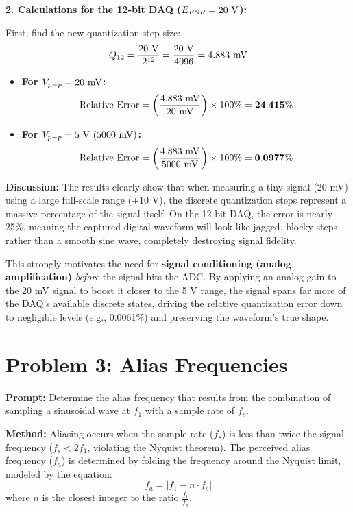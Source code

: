 \documentclass[11pt]{article}
\begin{document}
\textbf{2. Calculations for the 12-bit DAQ ($E_{FSR} = 20 \text{ \si{\volt}}$):}

First, find the new quantization step size:
\[ Q_{12} = \frac{20 \text{ \si{\volt}}}{2^{12}} = \frac{20 \text{ \si{\volt}}}{4096} = 4.883 \text{ \si{\milli\volt}} \]
\begin{itemize}
  \item \textbf{For $V_{p-p} = 20 \text{ \si{\milli\volt}}$:} \\
    \[ \text{Relative Error} = \left( \frac{4.883 \text{ \si{\milli\volt}}}{20 \text{ \si{\milli\volt}}} \right) \times 100\% = \mathbf{24.415\%} \]
  \item \textbf{For $V_{p-p} = 5 \text{ \si{\volt}} \ (5000 \text{ \si{\milli\volt}})$:} \\
    \[ \text{Relative Error} = \left( \frac{4.883 \text{ \si{\milli\volt}}}{5000 \text{ \si{\milli\volt}}} \right) \times 100\% = \mathbf{0.0977\%} \]
\end{itemize}

\textbf{Discussion:}
The results clearly show that when measuring a tiny signal (20 mV) using a large full-scale range ($\pm 10$ V), the discrete quantization steps represent a massive percentage of the signal itself. On the 12-bit DAQ, the error is nearly 25\%, meaning the captured digital waveform will look like jagged, blocky steps rather than a smooth sine wave, completely destroying signal fidelity.

This strongly motivates the need for \textbf{signal conditioning (analog amplification)} \textit{before} the signal hits the ADC. By applying an analog gain to the 20 mV signal to boost it closer to the 5 V range, the signal spans far more of the DAQ's available discrete states, driving the relative quantization error down to negligible levels (e.g., 0.0061\%) and preserving the waveform's true shape.

\section*{Problem 3: Alias Frequencies}

\textbf{Prompt:} Determine the alias frequency that results from the combination of sampling a sinusoidal wave at $f_1$ with a sample rate of $f_s$.

\textbf{Method:}
Aliasing occurs when the sample rate ($f_s$) is less than twice the signal frequency ($f_s < 2f_1$, violating the Nyquist theorem). The perceived alias frequency ($f_a$) is determined by folding the frequency around the Nyquist limit, modeled by the equation:
\[ f_a = |f_1 - n \cdot f_s| \]
where $n$ is the closest integer to the ratio $\frac{f_1}{f_s}$.
\end{document}
